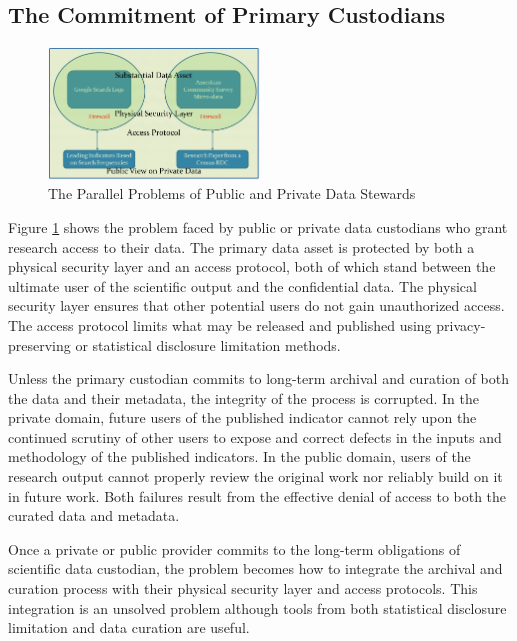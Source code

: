                       

%
%
%

\subsection{The Commitment of Primary Custodians}

\begin{figure}[tbp]
\centering
\caption{The Parallel Problems of Public and Private Data Stewards}
\label{fig:accesschart}\includegraphics[width=0.5\textwidth]{accesschart}
\end{figure}

Figure \ref{fig:accesschart} shows the problem faced by public or private
data custodians who grant research access to their data. The primary data
asset is protected by both a physical security layer and an access protocol,
both of which stand between the ultimate user of the scientific output and
the confidential data. The physical security layer ensures that other
potential users do not gain unauthorized access. The access protocol limits
what may be released and published using privacy-preserving or statistical
disclosure limitation methods.

Unless the primary custodian commits to long-term archival and curation of
both the data and their metadata, the integrity of the process is corrupted.
In the private domain, future users of the published indicator cannot rely
upon the continued scrutiny of other users to expose and correct defects in
the inputs and methodology of the published indicators. In the public
domain, users of the research output cannot properly review the original
work nor reliably build on it in future work. Both failures result from the
effective denial of access to both the curated data and metadata.

Once a private or public provider commits to the long-term obligations of
scientific data custodian, the problem becomes how to integrate the archival
and curation process with their physical security layer and access
protocols. This integration is an unsolved problem although tools from both
statistical disclosure limitation and data curation are useful.

